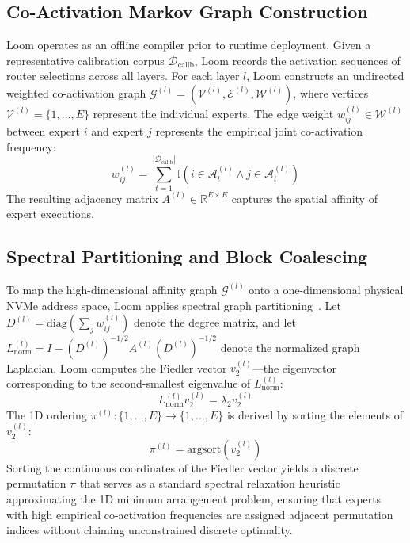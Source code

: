 \subsection{Co-Activation Markov Graph Construction}
Loom operates as an offline compiler prior to runtime deployment. Given a representative calibration corpus $\mathcal{D}_{\text{calib}}$, Loom records the activation sequences of router selections across all layers.
For each layer $l$, Loom constructs an undirected weighted co-activation graph $\mathcal{G}^{(l)} = (\mathcal{V}^{(l)}, \mathcal{E}^{(l)}, \mathcal{W}^{(l)})$, where vertices $\mathcal{V}^{(l)} = \{1, \dots, E\}$ represent the individual experts. The edge weight $w_{ij}^{(l)} \in \mathcal{W}^{(l)}$ between expert $i$ and expert $j$ represents the empirical joint co-activation frequency:
\begin{equation}
    w_{ij}^{(l)} = \sum_{t=1}^{|\mathcal{D}_{\text{calib}}|} \mathbb{I}\left( i \in \mathcal{A}_t^{(l)} \land j \in \mathcal{A}_t^{(l)} \right)
\end{equation}
The resulting adjacency matrix $A^{(l)} \in \mathbb{R}^{E \times E}$ captures the spatial affinity of expert executions.

\subsection{Spectral Partitioning and Block Coalescing}
To map the high-dimensional affinity graph $\mathcal{G}^{(l)}$ onto a one-dimensional physical NVMe address space, Loom applies spectral graph partitioning~\citep{von2007tutorial}.
Let $D^{(l)} = \text{diag}\left(\sum_j w_{ij}^{(l)}\right)$ denote the degree matrix, and let $L_{\text{norm}}^{(l)} = I - (D^{(l)})^{-1/2} A^{(l)} (D^{(l)})^{-1/2}$ denote the normalized graph Laplacian.
Loom computes the Fiedler vector $v_2^{(l)}$—the eigenvector corresponding to the second-smallest eigenvalue of $L_{\text{norm}}^{(l)}$:
\begin{equation}
    L_{\text{norm}}^{(l)} v_2^{(l)} = \lambda_2 v_2^{(l)}
\end{equation}
The 1D ordering $\pi^{(l)}: \{1, \dots, E\} \to \{1, \dots, E\}$ is derived by sorting the elements of $v_2^{(l)}$:
\begin{equation}
    \pi^{(l)} = \text{argsort}\left( v_2^{(l)} \right)
\end{equation}
Sorting the continuous coordinates of the Fiedler vector yields a discrete permutation $\pi$ that serves as a standard spectral relaxation heuristic approximating the 1D minimum arrangement problem, ensuring that experts with high empirical co-activation frequencies are assigned adjacent permutation indices without claiming unconstrained discrete optimality.

